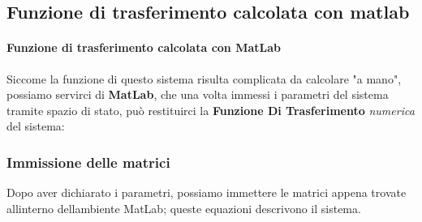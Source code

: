 \documentclass[
]{article}
\begin{document}
\newpage

\subsection{Funzione di trasferimento calcolata con matlab}{%
\paragraph{Funzione di trasferimento calcolata con
MatLab}\label{funzione-di-trasferimento-calcolata-con-matlab}}

Siccome la funzione di questo sistema risulta complicata da calcolare "a
mano", possiamo servirci di \textbf{MatLab}, che una volta immessi i
parametri del sistema tramite spazio di stato, può restituirci la
\textbf{Funzione Di Trasferimento} \emph{numerica} del sistema:

\hypertarget{immissione-delle-matrici}{%
\subsubsection{Immissione delle matrici}\label{immissione-delle-matrici}}

Dopo aver dichiarato i parametri, possiamo immettere le matrici appena
trovate all\textquotesingle interno dell\textquotesingle ambiente
MatLab; queste equazioni descrivono il sistema.
\end{document}
